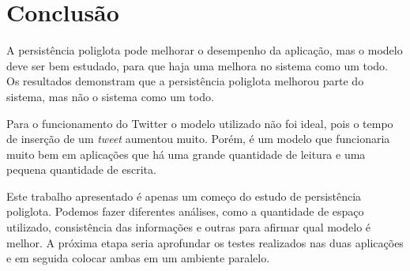 \chapter{Conclusão}
\label{chap:conclusao}

A persistência poliglota pode melhorar o desempenho da aplicação, mas o modelo deve ser bem estudado, para que haja uma melhora no sistema como um todo. Os resultados demonstram que a persistência poliglota melhorou parte do sistema, mas não o sistema como um todo.

Para o funcionamento do Twitter o modelo utilizado não foi ideal, pois o tempo de inserção de um \textit{tweet} aumentou muito. Porém, é um modelo que funcionaria muito bem em aplicações que há uma grande quantidade de leitura e uma pequena quantidade de escrita.

Este trabalho apresentado é apenas um começo do estudo de persistência poliglota. Podemos fazer diferentes análises, como a quantidade de espaço utilizado, consistência das informações e outras para afirmar qual modelo é melhor. A próxima etapa seria aprofundar os testes realizados nas duas aplicações e em seguida colocar ambas em um ambiente paralelo.


